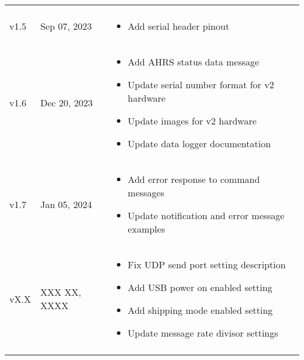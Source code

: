\begin{longtable}{| >{\centering}p{} | p{} | >{\raggedright\arraybackslash}p{} |}
\begin{itemize}
        \end{itemize}\\
        v1.5 & Sep 07, 2023 &
        \begin{itemize}
            \item Add serial header pinout
        \end{itemize}\\
        v1.6 & Dec 20, 2023 &
        \begin{itemize}
            \item Add \acs{AHRS} status data message
            \item Update serial number format for v2 hardware
            \item Update images for v2 hardware
            \item Update data logger documentation
        \end{itemize}\\
        v1.7 & Jan 05, 2024 &
        \begin{itemize}
            \item Add error response to command messages
            \item Update notification and error message examples
        \end{itemize}\\
        vX.X & XXX XX, XXXX &
        \begin{itemize}
            \item Fix \acs{UDP} send port setting description
			\item Add \ac{USB} power on enabled setting
			\item Add shipping mode enabled setting
			\item Update message rate divisor settings
        \end{itemize}\\
        \arrayrulecolor{gray!50}\hline
    \end{longtable}
\endgroup
